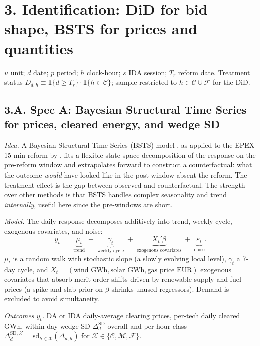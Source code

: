 \documentclass[11pt]{article}
\begin{document}
\section*{3. Identification: DiD for bid shape, BSTS for prices and quantities}
\label{sec:identification}

$u$ unit; $d$ date; $p$ period; $h$ clock-hour; $s$ IDA session; $T_r$ reform date. Treatment status $D_{d,h} \equiv \mathbf{1}\{d\ge T_r\}\cdot\mathbf{1}\{h\in\mathcal{C}\}$; sample restricted to $h\in\mathcal{C}\cup\mathcal{F}$ for the DiD.

\subsection*{3.A. Spec A: Bayesian Structural Time Series for prices, cleared energy, and wedge SD}\label{sec:bsts}

\emph{Idea.} A Bayesian Structural Time Series (BSTS) model \citep{brodersen_2015}, as applied to the EPEX 15-min reform by \citet{markle_huss_2017}, fits a flexible state-space decomposition of the response on the pre-reform window and extrapolates forward to construct a counterfactual: what the outcome \emph{would} have looked like in the post-window absent the reform. The treatment effect is the gap between observed and counterfactual. The strength over other methods is that BSTS handles complex seasonality and trend \emph{internally}, useful here since the pre-windows are short.

\emph{Model.} The daily response decomposes additively into trend, weekly cycle, exogenous covariates, and noise:
\[
y_t \;=\; \underbrace{\mu_t}_{\text{trend}} \;+\; \underbrace{\gamma_t}_{\text{weekly cycle}} \;+\; \underbrace{X_t'\beta}_{\text{exogenous covariates}} \;+\; \underbrace{\varepsilon_t}_{\text{noise}}.
\]
$\mu_t$ is a random walk with stochastic slope (a slowly evolving local level), $\gamma_t$ a 7-day cycle, and $X_t = (\text{wind GWh}, \text{solar GWh}, \text{gas price EUR})$ exogenous covariates that absorb merit-order shifts driven by renewable supply and fuel prices (a spike-and-slab prior on $\beta$ shrinks unused regressors). Demand is excluded to avoid simultaneity.

\emph{Outcomes $y_t$.} DA or IDA daily-average clearing prices, per-tech daily cleared GWh, within-day wedge SD $\Delta^{\text{SD}}_d$ overall and per hour-class $\Delta^{\text{SD},\mathcal{X}}_d = \mathrm{sd}_{h\in\mathcal{X}}(\Delta_{d,h})$ for $\mathcal{X}\in\{\mathcal{C},\mathcal{M},\mathcal{F}\}$.
\end{document}
